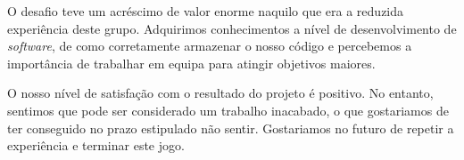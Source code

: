 \documentclass[a4paper]{report}
\begin{document}
O desafio teve um acréscimo de valor enorme naquilo que era a reduzida
experiência deste grupo. Adquirimos conhecimentos a nível de desenvolvimento
de \emph{software}, de como corretamente armazenar o nosso código e percebemos a
importância de trabalhar em equipa para atingir objetivos maiores.

O nosso nível de satisfação com o resultado do projeto é positivo. No entanto,
sentimos que pode ser considerado um trabalho inacabado, o que gostariamos de
ter conseguido no prazo estipulado não sentir. Gostariamos no futuro de repetir
a experiência e terminar este jogo.


% 
% 
\end{document}
